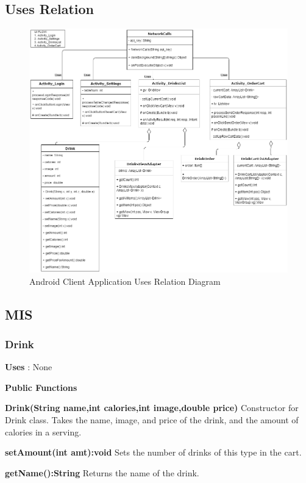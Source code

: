 \documentclass [10pt]{article}
\begin{document}
\subsection{Uses Relation}
\begin{figure} [h!]
	\centering
	\includegraphics [scale = 0.4] {figures/Client_UsesDiagram.png}
	\caption{Android Client Application Uses Relation Diagram}
\end{figure}



\subsection{MIS}

\subsubsection{Drink}

\textbf{Uses} : None

\textbf{Public Functions}

\textbf{Drink(String name,int calories,int image,double price)}
Constructor for Drink class. Takes the name, image, and price of the drink, and the amount of calories in a serving.

\textbf{setAmount(int amt):void}
Sets the number of drinks of this type in the cart.

\textbf{getName():String}
Returns the name of the drink.
\end{document}
